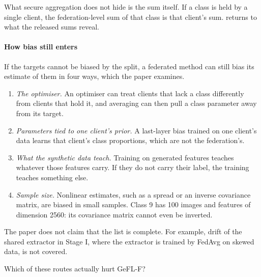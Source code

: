 What secure aggregation does not hide is the sum itself. If a class is held by a single client, the federation-level
sum of that class is that client's sum.  returns to what the released sums reveal.

\paragraph{How bias still enters}\label{sec:s-routes} If the targets cannot be biased by the split, a federated method can
still bias its estimate of them in four ways, which the paper examines.
\begin{enumerate}
\item \emph{The optimiser.} An optimiser can treat clients that lack a class differently from clients that hold it,
and averaging can then pull a class parameter away from its target.
\item \emph{Parameters tied to one client's prior.} A last-layer bias trained on one client's data learns that
client's class proportions, which are not the federation's.
\item \emph{What the synthetic data teach.} Training on generated features teaches whatever those features carry. If
they do not carry their label, the training teaches something else.
\item \emph{Sample size.} Nonlinear estimates, such as a spread or an inverse covariance matrix, are biased in small
samples. Class 9 has 100 images and features of dimension 2560: its covariance matrix cannot even be inverted.
\end{enumerate}
The paper does not claim that the list is complete. For example, drift of the shared extractor in Stage I, where the
extractor is trained by FedAvg on skewed data, is not covered.

Which of these routes actually hurt GeFL-F?
